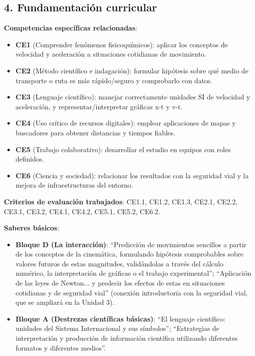 \documentclass[11pt,a4paper]{article}
\begin{document}
\subsection*{4. Fundamentación curricular}
\textbf{Competencias específicas relacionadas}:
\begin{itemize}
    \item \textbf{CE1} (Comprender fenómenos fisicoquímicos): aplicar los conceptos de velocidad y aceleración a situaciones cotidianas de movimiento.
    \item \textbf{CE2} (Método científico e indagación): formular hipótesis sobre qué medio de transporte o ruta es más rápido/seguro y comprobarlo con datos.
    \item \textbf{CE3} (Lenguaje científico): manejar correctamente unidades SI de velocidad y aceleración, y representar/interpretar gráficas x-t y v-t.
    \item \textbf{CE4} (Uso crítico de recursos digitales): emplear aplicaciones de mapas y buscadores para obtener distancias y tiempos fiables.
    \item \textbf{CE5} (Trabajo colaborativo): desarrollar el estudio en equipos con roles definidos.
    \item \textbf{CE6} (Ciencia y sociedad): relacionar los resultados con la seguridad vial y la mejora de infraestructuras del entorno.
\end{itemize}

\textbf{Criterios de evaluación trabajados}: CE1.1, CE1.2, CE1.3, CE2.1, CE2.2, CE3.1, CE3.2, CE4.1, CE4.2, CE5.1, CE5.2, CE6.2.

\textbf{Saberes básicos}:
\begin{itemize}
    \item \textbf{Bloque D (La interacción)}: ``Predicción de movimientos sencillos a partir de los conceptos de la cinemática, formulando hipótesis comprobables sobre valores futuros de estas magnitudes, validándolas a través del cálculo numérico, la interpretación de gráficas o el trabajo experimental''; ``Aplicación de las leyes de Newton... y predecir los efectos de estas en situaciones cotidianas y de seguridad vial'' (conexión introductoria con la seguridad vial, que se ampliará en la Unidad 3).
    \item \textbf{Bloque A (Destrezas científicas básicas)}: ``El lenguaje científico: unidades del Sistema Internacional y sus símbolos''; ``Estrategias de interpretación y producción de información científica utilizando diferentes formatos y diferentes medios''.
\end{itemize}
\end{document}
